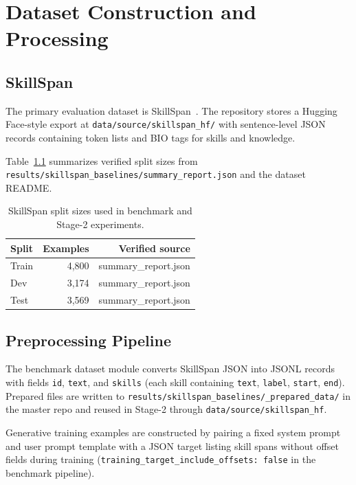 \chapter{Dataset Construction and Processing}
\label{ch:dataset}

\section{SkillSpan}

The primary evaluation dataset is SkillSpan~\cite{zhang2022skillspan}.
The repository stores a Hugging Face-style export at \texttt{data/source/skillspan\_hf/} with sentence-level JSON records containing token lists and BIO tags for skills and knowledge.

Table~\ref{tab:skillspan-splits} summarizes verified split sizes from \texttt{results/skillspan\_baselines/summary\_report.json} and the dataset README.

\begin{table}[htbp]
  \centering
  \caption{SkillSpan split sizes used in benchmark and Stage-2 experiments.}
  \label{tab:skillspan-splits}
  \begin{tabular}{lrr}
    \toprule
    Split & Examples & Verified source \\
    \midrule
    Train & 4{,}800 & summary\_report.json \\
    Dev   & 3{,}174 & summary\_report.json \\
    Test  & 3{,}569 & summary\_report.json \\
    \bottomrule
  \end{tabular}
\end{table}

\section{Preprocessing Pipeline}

The benchmark dataset module converts SkillSpan JSON into JSONL records with fields \texttt{id}, \texttt{text}, and \texttt{skills} (each skill containing \texttt{text}, \texttt{label}, \texttt{start}, \texttt{end}).
Prepared files are written to \texttt{results/skillspan\_baselines/\_prepared\_data/} in the master repo and reused in Stage-2 through \texttt{data/source/skillspan\_hf}.

Generative training examples are constructed by pairing a fixed system prompt and user prompt template with a JSON target listing skill spans without offset fields during training (\texttt{training\_target\_include\_offsets: false} in the benchmark pipeline).

